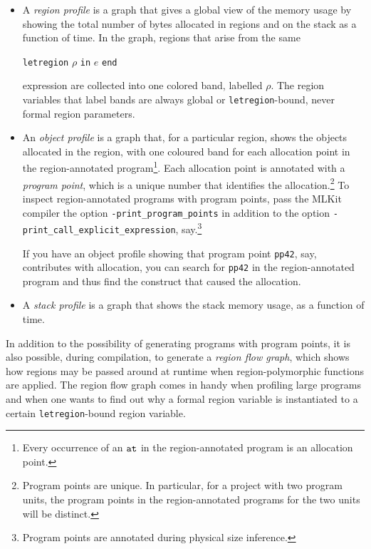 \documentclass[12pt]{book}
\begin{document}
\begin{itemize}
\item A 
  {\em region profile\/} is a graph that gives a global view of the
  memory usage by showing the total number of bytes allocated in
  regions and on the stack as a function of time. In the graph,
  regions that arise from the same
  \begin{center}
    \texttt{letregion} $\rho$ \texttt{in} $e$ \texttt{end}
  \end{center}
  expression are collected into one colored band, labelled $\rho$. The
  region variables that label bands are always global or {\tt letregion}-bound,
  never formal region parameters.
\item An 
  {\em object profile\/} is a graph that, for a particular region,
  shows the objects allocated in the region, with one coloured band
  for each allocation point in the region-annotated
  program\footnote{Every occurrence of an $\mathbin{\hbox{\tt at}}$ in the
    region-annotated program is an allocation point.}. Each allocation
  point is annotated with a
  {\em program point}, which is a unique number that identifies the
  allocation.\footnote{Program points are unique. In particular, for a
    project with two program units, the program points in the
    region-annotated programs for the two units will be distinct.}  To
  inspect region-annotated programs with program points, pass the
  MLKit compiler the option \texttt{-print\_program\_points} in
  addition to the option \texttt{-print\_call\_explicit\_expression},
  say.\footnote{Program points are annotated during physical size
    inference.}
  
  If you have an object profile showing that program point
  \texttt{pp42}, say, contributes with allocation, you can search for
  \texttt{pp42} in the region-annotated program and thus find the
  construct that caused the allocation.
\item A 
  {\em stack profile\/} is a graph that shows the stack memory usage,
  as a function of time.
\end{itemize}
  
In addition to the possibility of generating programs with program
points, it is also possible, during compilation, to generate a
%
{\em region flow graph}, which shows how regions may be passed around
at runtime when region-polymorphic functions are applied. The region
flow graph comes in handy when profiling large programs and when one wants
to find out why a formal region variable is instantiated to a
certain {\tt letregion}-bound region variable.
\end{document}
